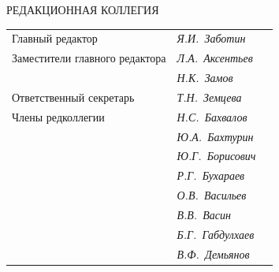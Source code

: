 




\pagestyle{empty}





\bigskip


\bigskip


\centerline{\Large РЕДАКЦИОННАЯ КОЛЛЕГИЯ}


\bigskip


\bigskip


\begin{tabular}{p{63mm}p{40mm}p{50mm}}


Главный редактор               &   \it Я.И.~Заботин & \\


Заместители главного редактора &   \it Л.А.~Аксентьев  & \\


                               &   \it Н.К.~Замов  & \\


Ответственный секретарь        &   \it Т.Н.~Земцева & \\[3mm]


Члены редколлегии              &   \it Н.С.~Бахвалов & \\


                               &   \it Ю.А.~Бахтурин  & \\


                               &   \it Ю.Г.~Борисович & \\


                               &   \it Р.Г.~Бухараев & \\


                               &   \it О.В.~Васильев  & \\


                               &   \it В.В.~Васин  & \\


                               &   \it Б.Г.~Габдулхаев & \\


                               &   \it В.Ф.~Демьянов & \\



\end{tabular}
